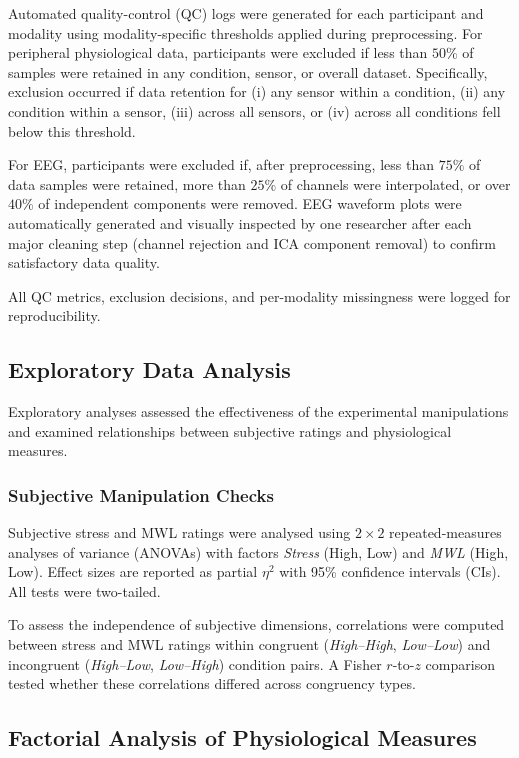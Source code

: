 \documentclass[lettersize,journal]{IEEEtran}
\begin{document}
Automated quality-control (QC) logs were generated for each participant and modality using modality-specific thresholds applied during preprocessing. For peripheral physiological data, participants were excluded if less than $50\%$ of samples were retained in any condition, sensor, or overall dataset. Specifically, exclusion occurred if data retention for (i) any sensor within a condition, (ii) any condition within a sensor, (iii) across all sensors, or (iv) across all conditions fell below this threshold.

For EEG, participants were excluded if, after preprocessing, less than $75\%$ of data samples were retained, more than $25\%$ of channels were interpolated, or over $40\%$ of independent components were removed. EEG waveform plots were automatically generated and visually inspected by one researcher after each major cleaning step (channel rejection and ICA component removal) to confirm satisfactory data quality.

All QC metrics, exclusion decisions, and per-modality missingness were logged for reproducibility.

\subsection{Exploratory Data Analysis}

Exploratory analyses assessed the effectiveness of the experimental manipulations and examined relationships between subjective ratings and physiological measures.

\subsubsection{Subjective Manipulation Checks}
Subjective stress and MWL ratings were analysed using $2\times2$ repeated-measures analyses of variance (ANOVAs) with factors \textit{Stress} (High, Low) and \textit{MWL} (High, Low). Effect sizes are reported as partial $\eta^2$ with 95\% confidence intervals (CIs). 
All tests were two-tailed. 

To assess the independence of subjective dimensions, correlations were computed between stress and MWL ratings within congruent (\textit{High–High}, \textit{Low–Low}) and incongruent (\textit{High–Low}, \textit{Low–High}) condition pairs. 
A Fisher \(r\)-to-\(z\) comparison tested whether these correlations differed across congruency types.

\subsection{Factorial Analysis of Physiological Measures}
\end{document}
